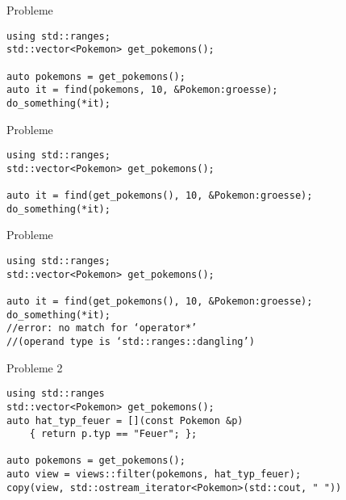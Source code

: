 \begin{frame}[fragile]{Probleme}
    \begin{verbatim}
using std::ranges;
std::vector<Pokemon> get_pokemons();

auto pokemons = get_pokemons();
auto it = find(pokemons, 10, &Pokemon:groesse);
do_something(*it);
    \end{verbatim}
\end{frame}

\begin{frame}[fragile]{Probleme}
    \begin{verbatim}
using std::ranges;
std::vector<Pokemon> get_pokemons();

auto it = find(get_pokemons(), 10, &Pokemon:groesse);
do_something(*it);
    \end{verbatim}
\end{frame}

\begin{frame}[fragile]{Probleme}
    \begin{verbatim}
using std::ranges;
std::vector<Pokemon> get_pokemons();

auto it = find(get_pokemons(), 10, &Pokemon:groesse);
do_something(*it);
//error: no match for ‘operator*’
//(operand type is ‘std::ranges::dangling’)
    \end{verbatim}
\end{frame}

\begin{frame}[fragile]{Probleme 2}
    \begin{verbatim}
using std::ranges
std::vector<Pokemon> get_pokemons();
auto hat_typ_feuer = [](const Pokemon &p)
    { return p.typ == "Feuer"; };

auto pokemons = get_pokemons();
auto view = views::filter(pokemons, hat_typ_feuer);
copy(view, std::ostream_iterator<Pokemon>(std::cout, " "))
    \end{verbatim}
\end{frame}